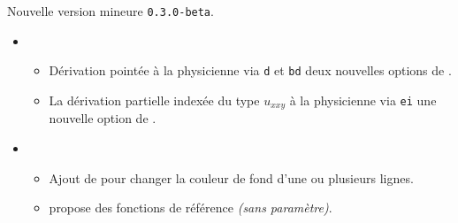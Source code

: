 Nouvelle version mineure \verb+0.3.0-beta+.

\begin{itemize}[itemsep=.5em]
    \item {}
    \begin{itemize}[itemsep=.5em]
        \item Dérivation pointée à la physicienne via \verb+d+ et \verb+bd+ deux nouvelles options de .

        \item La dérivation partielle indexée du type $u_{xxy}$ à la physicienne via \verb+ei+ une nouvelle option de .
    \end{itemize}



    \separation


    \item {}
    \begin{itemize}[itemsep=.5em]
        \item Ajout de  pour changer la couleur de fond d'une ou plusieurs lignes.


        \item {} propose des fonctions de référence \emph{(sans paramètre)}.
    \end{itemize}



    \separation
\end{itemize}
